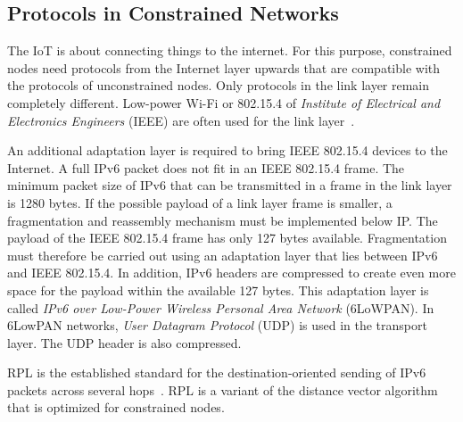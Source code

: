 \documentclass[english,version-2019-11]{uzl-thesis}
\begin{document}
\subsection{Protocols in Constrained Networks}
The IoT is about connecting things to the internet. For this purpose, constrained nodes need protocols from the Internet layer upwards that are compatible with the protocols of unconstrained nodes. Only protocols in the link layer remain completely different. Low-power Wi-Fi or 802.15.4 of \emph{Institute of Electrical and Electronics Engineers} (IEEE) are often used for the link layer~\cite{rfc7102}.

An additional adaptation layer is required to bring IEEE 802.15.4 devices to the Internet. A full IPv6 packet does not fit in an IEEE 802.15.4 frame. The minimum packet size of IPv6 that can be transmitted in a frame in the link layer is 1280 bytes. If the possible payload of a link layer frame is smaller, a fragmentation and reassembly mechanism must be implemented below IP. The payload of the IEEE 802.15.4 frame has only 127 bytes available. Fragmentation must therefore be carried out using an adaptation layer that lies between IPv6 and IEEE 802.15.4. In addition, IPv6 headers are compressed to create even more space for the payload within the available 127 bytes.
This adaptation layer is called \emph{IPv6 over Low-Power Wireless Personal Area Network} (6LoWPAN). In 6LowPAN networks, \emph{User Datagram Protocol} (UDP) is used in the transport layer. The UDP header is also compressed.~\cite{rfc4944}

RPL is the established standard for the destination-oriented sending of IPv6 packets across several hops~\cite{RPLApplications}. RPL is a variant of the distance vector algorithm that is optimized for constrained nodes.
\end{document}
